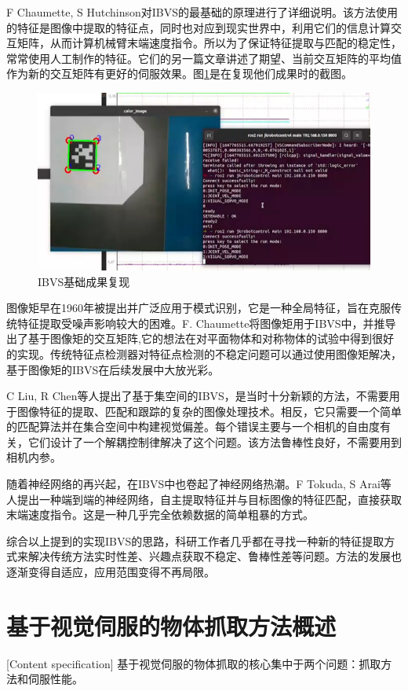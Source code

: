 \documentclass[fontset=fandol,type=bachelor,campus=harbin]{hithesisbook}
\begin{document}
F Chaumette, S Hutchinson对IBVS的最基础的原理进行了详细说明\cite{chaumette2006visual}。该方法使用的特征是图像中提取的特征点，同时也对应到现实世界中，利用它们的信息计算交互矩阵，从而计算机械臂末端速度指令。所以为了保证特征提取与匹配的稳定性，常常使用人工制作的特征。它们的另一篇文章讲述了期望、当前交互矩阵的平均值作为新的交互矩阵有更好的伺服效果\cite{chaumette2007visual}。图\ref{IBVS基础复现}是在复现他们成果时的截图。
\begin{figure}[htbp]
\centering
\includegraphics[scale=0.5]{chapter1/IBVS基础成果复现}
\caption{IBVS基础成果复现}
\label{IBVS基础复现}
\end{figure}


图像矩早在1960年被提出并广泛应用于模式识别，它是一种全局特征，旨在克服传统特征提取受噪声影响较大的困难。F. Chaumette将图像矩用于IBVS中，并推导出了基于图像矩的交互矩阵\cite{chaumette2004image},它的想法在对平面物体和对称物体的试验中得到很好的实现。传统特征点检测器对特征点检测的不稳定问题可以通过使用图像矩解决，基于图像矩的IBVS在后续发展中大放光彩。


C Liu, R Chen等人提出了基于集空间的IBVS\cite{liu2017set}，是当时十分新颖的方法，不需要用于图像特征的提取、匹配和跟踪的复杂的图像处理技术。相反，它只需要一个简单的匹配算法并在集合空间中构建视觉偏差。每个错误主要与一个相机的自由度有关，它们设计了一个解耦控制律解决了这个问题。该方法鲁棒性良好，不需要用到相机内参。


随着神经网络的再兴起，在IBVS中也卷起了神经网络热潮。F Tokuda, S Arai等人提出一种端到端的神经网络\cite{tokuda2021convolutional}，自主提取特征并与目标图像的特征匹配，直接获取末端速度指令。这是一种几乎完全依赖数据的简单粗暴的方式。


综合以上提到的实现IBVS的思路，科研工作者几乎都在寻找一种新的特征提取方式来解决传统方法实时性差、兴趣点获取不稳定、鲁棒性差等问题。方法的发展也逐渐变得自适应，应用范围变得不再局限。
\section{基于视觉伺服的物体抓取方法概述}[Content specification]
基于视觉伺服的物体抓取的核心集中于两个问题：抓取方法和伺服性能。
\end{document}
